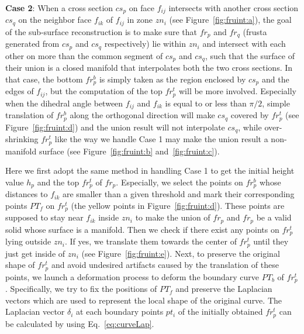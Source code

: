 \textbf{Case 2}: When  a cross section $cs_p$ on face $f_{ij}$
intersects with another cross section $cs_q$ on the neighbor face
$f_{ik}$ of $f_{ij}$ in zone $zn_i$ (see Figure~\ref{fig:fruint:a}),
the goal of the sub-surface reconstruction is to make sure that
$fr_p$ and $fr_q$ (frusta generated from $cs_p$ and $cs_q$
respectively) lie within $zn_i$ and intersect with each other on
more than the common segment of $cs_p$ and $cs_q$, such that the
surface of their union is a closed manifold that interpolates both
the two cross sections. In that case, the bottom $fr_p^b$ is simply
taken as the region enclosed by $cs_p$ and the edges of $f_{ij}$,
but the computation of the top $fr_p^t$ will be more involved.
Especially when the dihedral angle between $f_{ij}$ and $f_{ik}$ is
equal to or less than $\pi/2$, simple translation of $fr_p^b$ along
the orthogonal direction will make $cs_q$ covered by $fr_p^t$ (see
Figure~\ref{fig:fruint:d}) and the union result will not interpolate
$cs_q$, while over-shrinking $fr_p^t$ like the way we handle Case 1
may make the union result a non-manifold surface (see
Figure~\ref{fig:fruint:b} and~\ref{fig:fruint:c}).

Here we first adopt  the same method in handling Case 1 to get the
initial height value $h_p$ and the top $fr_p^t$ of $fr_p$.
Especially, we select the points on $fr_p^b$ whose distances to
$f_{ik}$ are smaller than a given threshold and mark their
corresponding points $PT_f$ on $fr_p^t$ (the yellow points in
Figure~\ref{fig:fruint:d}). These points are supposed to stay near
$f_{ik}$ inside $zn_i$ to make the union of $fr_p$ and $fr_p$ be a
valid solid whose surface is a manifold. Then we check if there
exist any points on $fr_p^t$ lying outside $zn_i$. If yes, we
translate them towards the center of $fr_p^t$ until they just get
inside of $zn_i$ (see Figure~\ref{fig:fruint:e}). Next, to preserve
the original shape of $fr_p^t$ and avoid undesired artifacts caused
by the translation of these points, we launch a deformation process
to deform the boundary curve $PT_b$ of $fr_p^t$. Specifically, we
try to fix the positions of $PT_f$ and preserve the Laplacian
vectors which are used to represent the local shape of the original
curve.
The Laplacian vector $\delta_i$ at each boundary points $pt_i$
of the initially obtained $fr_p^t$ can be calculated by using
Eq.~\ref{eq:curveLap}.

%


